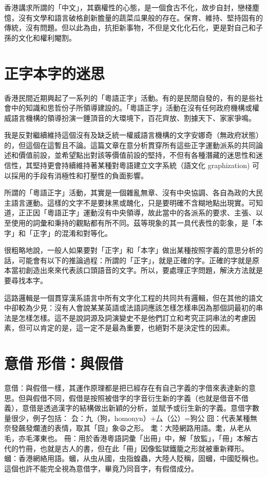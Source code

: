 \documentclass[a5paper, 10pt, openany]{book} %
\begin{document}
香港講求所謂的「中文」，其霸權性的心態，是一個食古不化，故步自封，戀棧塵憶，沒有文學和語言破格創新膽量的蔬菜瓜果般的存在。保育、維持、堅持固有的傳統，沒有問題。但以此為由，抗拒新事物，不但是文化化石化，更是對自己和子孫的文化和權利閹割。


\chapter{正字本字的迷思}

香港民間近期興起了一系列的「粵語正字」活動。有的是民間自發的，有的是些社會中的知識和思哲份子所領導建設的。「粵語正字」活動在沒有任何政府機構或權威語言機構的領導扮演一錘頂音的大環境下，百花齊放、割據天下、家家爭鳴。

我是反對繼續維持這個沒有及缺乏統一權威語言機構的文字安娜奇（無政府狀態）的，但這個在這暫且不論。這篇文章在意分析貫穿所有這些正字運動派系的共同論述和價值前設，並希望點出對該等價值前設的堅持，不但有各種潛藏的迷思性和迷信性，其堅持更會持續維持著某種對粵語建立文字系統（語文化 graphization) 可以採用的手段有消極性和打壓性的負面影響。

所謂的「粵語正字」活動，其實是一個雜亂無章、沒有中央協調、各自為政的大民主語言運動。這樣的文字不是要抹黑或醜化，只是要明確不含糊地點出現實。可知道，正正因「粵語正字」運動沒有中央領導，故此當中的各派系的要求、主張、以至使用的詞彙和秉持的觀點都有所不同。茲等現象的其一具代表性的彰象，是「本字」和「正字」的混淆和對等化。

很粗略地說，一般人如果要對「正字」和「本字」做出某種按照字義的意思分析的話，可能會有以下的推論過程：所謂的「正字」，就是正確的字。正確的字就是原本當初創造出來來代表該口頭語音的文字。所以，要處理正字問題，解決方法就是要尋找本字。

這路邏輯是一個貫穿漢系語言中所有文字化工程的共同共有邏輯，但在其他的語文中卻較為少見：沒有人會說某某英語或法語詞應該怎樣怎樣串因為那個詞最初的串法是怎樣怎樣。這不是說詞源及詞演變史不是他們訂立和考究正詞串法的考慮因素，但可以肯定的是，這一定不是最為重要，也絕對不是決定性的因素。


\chapter{意借形借：與假借}
意借：與假借一樣，其運作原理都是把已經存在有自己字義的字借來表達新的意思。但與假借不同，假借是按照被借字的字音衍生新的字義（也就是借音不借義），意借是透過漢字的結構做出新穎的分析，並賦予或衍生新的字義。意借字數量很少，例子包括：
厹：九（狗，homonyn）+厶（公）=狗公
囧：代表某種無奈發飆發爛渣的表情，取其「囧」象😩之形。
耄：大陸網路用語。耄，从老从毛，亦毛澤東也。
冊：用於香港粵語詞彙「出冊」中，解「放監」，「冊」本解古代的竹冊，也就是古人的書，但在此「冊」因像監獄鐵籠之形就被重新釋形。
蟈：香港網絡用語。蟈，从虫从國，虫指蝗蟲，大陸人貶稱，固蟈，中國貶稱也。這個也許不能完全視為意借字，畢竟乃同音字，有假借成分。
\end{document}
